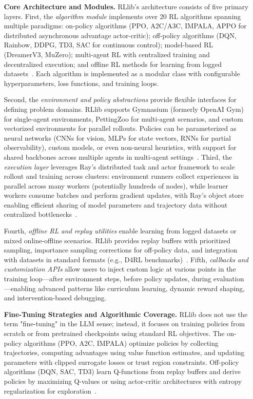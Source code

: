 \documentclass[conference]{IEEEtran}
\begin{document}
\textbf{Core Architecture and Modules.} RLlib's architecture consists of five primary layers. First, the \textit{algorithm module} implements over 20 RL algorithms spanning multiple paradigms: on-policy algorithms (PPO, A2C/A3C, IMPALA, APPO for distributed asynchronous advantage actor-critic); off-policy algorithms (DQN, Rainbow, DDPG, TD3, SAC for continuous control); model-based RL (DreamerV3, MuZero); multi-agent RL with centralized training and decentralized execution; and offline RL methods for learning from logged datasets~\cite{rllib-docs}. Each algorithm is implemented as a modular class with configurable hyperparameters, loss functions, and training loops.

Second, the \textit{environment and policy abstractions} provide flexible interfaces for defining problem domains. RLlib supports Gymnasium (formerly OpenAI Gym) for single-agent environments, PettingZoo for multi-agent scenarios, and custom vectorized environments for parallel rollouts. Policies can be parameterized as neural networks (CNNs for vision, MLPs for state vectors, RNNs for partial observability), custom models, or even non-neural heuristics, with support for shared backbones across multiple agents in multi-agent settings~\cite{rllib-docs}. Third, the \textit{execution layer} leverages Ray's distributed task and actor framework to scale rollout and training across clusters: environment runners collect experiences in parallel across many workers (potentially hundreds of nodes), while learner workers consume batches and perform gradient updates, with Ray's object store enabling efficient sharing of model parameters and trajectory data without centralized bottlenecks~\cite{rllib-paper}.

Fourth, \textit{offline RL and replay utilities} enable learning from logged datasets or mixed online-offline scenarios. RLlib provides replay buffers with prioritized sampling, importance sampling corrections for off-policy data, and integration with datasets in standard formats (e.g., D4RL benchmarks)~\cite{rllib-docs}. Fifth, \textit{callbacks and customization APIs} allow users to inject custom logic at various points in the training loop—after environment steps, before policy updates, during evaluation—enabling advanced patterns like curriculum learning, dynamic reward shaping, and intervention-based debugging.

\textbf{Fine-Tuning Strategies and Algorithmic Coverage.} RLlib does not use the term "fine-tuning" in the LLM sense; instead, it focuses on training policies from scratch or from pretrained checkpoints using standard RL objectives. The on-policy algorithms (PPO, A2C, IMPALA) optimize policies by collecting trajectories, computing advantages using value function estimates, and updating parameters with clipped surrogate losses or trust region constraints. Off-policy algorithms (DQN, SAC, TD3) learn Q-functions from replay buffers and derive policies by maximizing Q-values or using actor-critic architectures with entropy regularization for exploration~\cite{rllib-paper}.
\end{document}
